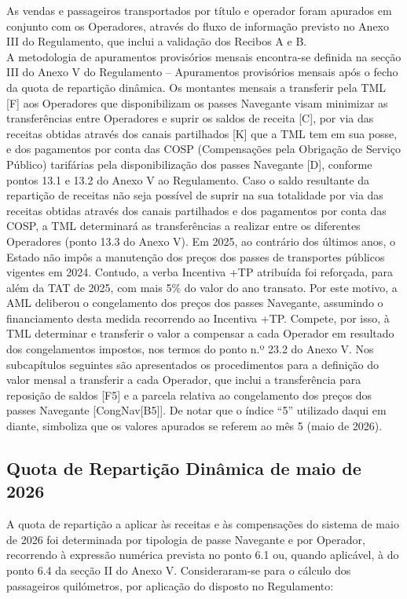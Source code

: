 \documentclass[
  a4paper,
]{article}
\begin{document}
As vendas e passageiros transportados por título e operador foram
apurados em conjunto com os Operadores, através do fluxo de informação
previsto no Anexo III do Regulamento, que inclui a validação dos Recibos
A e B.\\
A metodologia de apuramentos provisórios mensais encontra-se definida na
secção III do Anexo V do Regulamento -- Apuramentos provisórios mensais
após o fecho da quota de repartição dinâmica. Os montantes mensais a
transferir pela TML {[}F{]} aos Operadores que disponibilizam os passes
Navegante visam minimizar as transferências entre Operadores e suprir os
saldos de receita {[}C{]}, por via das receitas obtidas através dos
canais partilhados {[}K{]} que a TML tem em sua posse, e dos pagamentos
por conta das COSP (Compensações pela Obrigação de Serviço Público)
tarifárias pela disponibilização dos passes Navegante {[}D{]}, conforme
pontos 13.1 e 13.2 do Anexo V ao Regulamento. Caso o saldo resultante da
repartição de receitas não seja possível de suprir na sua totalidade por
via das receitas obtidas através dos canais partilhados e dos pagamentos
por conta das COSP, a TML determinará as transferências a realizar entre
os diferentes Operadores (ponto 13.3 do Anexo V). Em 2025, ao contrário
dos últimos anos, o Estado não impôs a manutenção dos preços dos passes
de transportes públicos vigentes em 2024. Contudo, a verba Incentiva +TP
atribuída foi reforçada, para além da TAT de 2025, com mais 5\% do valor
do ano transato. Por este motivo, a AML deliberou o congelamento dos
preços dos passes Navegante, assumindo o financiamento desta medida
recorrendo ao Incentiva +TP. Compete, por isso, à TML determinar e
transferir o valor a compensar a cada Operador em resultado dos
congelamentos impostos, nos termos do ponto n.º 23.2 do Anexo V. Nos
subcapítulos seguintes são apresentados os procedimentos para a
definição do valor mensal a transferir a cada Operador, que inclui a
transferência para reposição de saldos {[}F5{]} e a parcela relativa ao
congelamento dos preços dos passes Navegante {[}CongNav{[}B5{]}{]}. De
notar que o índice ``5'' utilizado daqui em diante, simboliza que os
valores apurados se referem ao mês 5 (maio de 2026).

\subsection{Quota de Repartição Dinâmica de maio de
2026}\label{quota-de-repartiuxe7uxe3o-dinuxe2mica-de-maio-de-2026}

A quota de repartição a aplicar às receitas e às compensações do sistema
de maio de 2026 foi determinada por tipologia de passe Navegante e por
Operador, recorrendo à expressão numérica prevista no ponto 6.1 ou,
quando aplicável, à do ponto 6.4 da secção II do Anexo V.
Consideraram-se para o cálculo dos passageiros quilómetros, por
aplicação do disposto no Regulamento:
\end{document}

